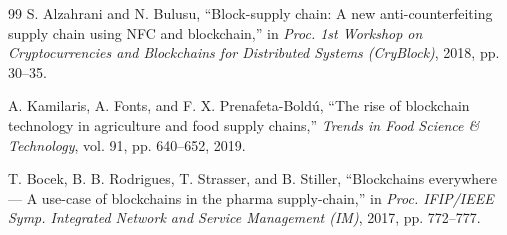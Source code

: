 \documentclass[12pt,a4paper]{report}
\begin{document}
\begin{thebibliography}{99}
 S. Alzahrani and N. Bulusu, ``Block-supply chain: A new anti-counterfeiting supply chain using NFC and blockchain,'' in \textit{Proc. 1st Workshop on Cryptocurrencies and Blockchains for Distributed Systems (CryBlock)}, 2018, pp. 30--35.

 A. Kamilaris, A. Fonts, and F. X. Prenafeta-Boldú, ``The rise of blockchain technology in agriculture and food supply chains,'' \textit{Trends in Food Science \& Technology}, vol. 91, pp. 640--652, 2019.

 T. Bocek, B. B. Rodrigues, T. Strasser, and B. Stiller, ``Blockchains everywhere --- A use-case of blockchains in the pharma supply-chain,'' in \textit{Proc. IFIP/IEEE Symp. Integrated Network and Service Management (IM)}, 2017, pp. 772--777.

\end{thebibliography}
\end{document}
